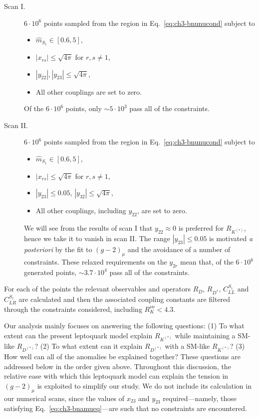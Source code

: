 \begin{description}
\item [Scan I.] $6 \cdot 10^6$ points sampled from the region in
  Eq.~\eqref{eq:ch3-bnunucond} subject to
  \begin{itemize}
  \item $\hat{m}_{S_{1}} \in [0.6,5]$,
  \item $|x_{rs}| \leq \sqrt{4\pi}$ for ${r,s \neq 1}$,
  \item $|y_{22}|, |y_{23}| \leq \sqrt{4\pi}$,
  \item All other couplings are set to zero.
  \end{itemize}
  Of the $6 \cdot 10^6$ points, only $\sim 5 \cdot 10^3$ pass all of the
  constraints.
\item [Scan II.] $6 \cdot 10^6$ points sampled from the region in
  Eq.~\eqref{eq:ch3-bnunucond} subject to
  \begin{itemize}
  \item $\hat{m}_{S_{1}} \in [0.6,5]$,
  \item $|x_{rs}| \leq \sqrt{4\pi}$ for ${r,s \neq 1}$,
  \item $|y_{23}| \leq 0.05$, $|y_{32}| \leq \sqrt{4\pi}$,
  \item All other couplings, including $y_{22}$, are set to zero.
  \end{itemize}
  We will see from the results of scan I that $y_{22} \approx 0$ is preferred
  for $R_{K^{(*)}}$, hence we take it to vanish in scan II. The range $|y_{23}|
  \leq 0.05$ is motivated \textit{a posteriori} by the fit to $(g - 2)_\mu$ and
  the avoidance of a number of constraints. These relaxed requirements on the
  $y_{2r}$ mean that, of the $6 \cdot 10^6$ generated points, $\sim 3.7 \cdot
  10^4$ pass all of the constraints.
\end{description}
For each of the points the relevant observables and operators $R_D$, $R_{D^*}$,
$C_{LL}^{S_{1}}$ and $C_{LR}^{S_{1}}$ are calculated and then the associated coupling
constants are filtered through the constraints considered, including
$R_K^{\nu\nu} < 4.3$.

Our analysis mainly focuses on answering the following questions: (1) To what
extent can the present leptoquark model explain $R_{K^{(*)}}$ while maintaining
a SM-like $R_{D^{(*)}}$? (2) To what extent can it explain $R_{D^{(*)}}$ with a
SM-like $R_{K^{(*)}}$? (3) How well can all of the anomalies be explained
together? These questions are addressed below in the order given above.
Throughout this discussion, the relative ease with which this leptoquark model
can explain the tension in $(g-2)_\mu$ is exploited to simplify our study. We do
not include its calculation in our numerical scans, since the values of $x_{23}$
and $y_{23}$ required---namely, those satisfying Eq.~\eqref{eq:ch3-bnamueq}---are
such that no constraints are encountered.



